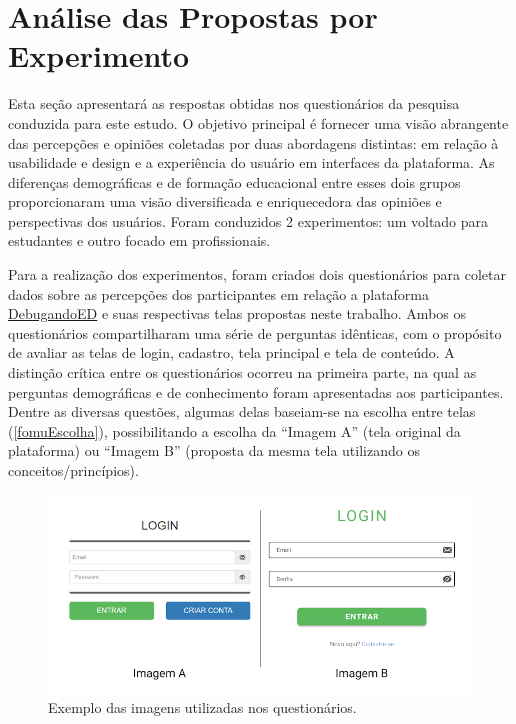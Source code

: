 \section{Análise das Propostas por Experimento}
\label{secAnálisePropostasExperimento}

Esta seção apresentará as respostas obtidas nos questionários da pesquisa conduzida para este estudo. O objetivo principal é fornecer uma visão abrangente das percepções e opiniões coletadas por duas abordagens distintas: em relação à usabilidade e design e a experiência do usuário em interfaces da plataforma. As diferenças demográficas e de formação educacional entre esses dois grupos proporcionaram uma visão diversificada e enriquecedora das opiniões e perspectivas dos usuários. Foram conduzidos 2 experimentos: um voltado para estudantes e outro focado em profissionais. 

Para a realização dos experimentos, foram criados dois questionários para coletar dados sobre as percepções dos participantes em relação a plataforma \href{https://debugandoed.facom.ufu.br/}{DebugandoED} e suas respectivas telas propostas neste trabalho. Ambos os questionários compartilharam uma série de perguntas idênticas, com o propósito de avaliar as telas de login, cadastro, tela principal e tela de conteúdo. A distinção crítica entre os questionários ocorreu na primeira parte, na qual as perguntas demográficas e de conhecimento foram apresentadas aos participantes. Dentre as diversas questões, algumas delas baseiam-se na escolha entre telas (\autoref{fomuEscolha}), possibilitando a escolha da ``Imagem A'' (tela original da plataforma) ou ``Imagem B'' (proposta da mesma tela utilizando os conceitos/princípios).

\begin{figure}[ht]
    \begin{center}
	    \includegraphics[scale=0.4]{figs/form_compara.png}
	\end{center}
    \caption{\label{fomuEscolha}Exemplo das imagens utilizadas nos questionários.}
\end{figure}

